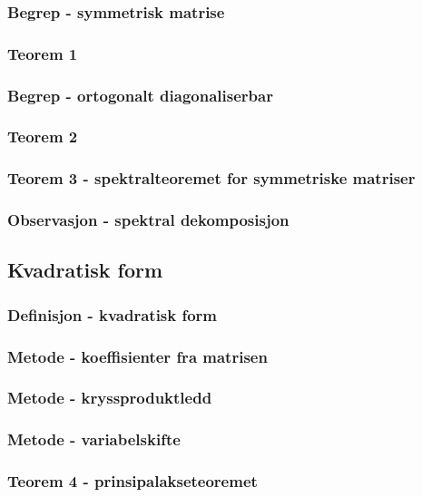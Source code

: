 \documentclass{article}
\begin{document}
      \subsubsection{Begrep - symmetrisk matrise}
        
      \subsubsection{Teorem 1}
        
      \subsubsection{Begrep - ortogonalt diagonaliserbar}
        
      \subsubsection{Teorem 2}
        
      \subsubsection{Teorem 3 - spektralteoremet for symmetriske matriser}
        
      \subsubsection{Observasjon - spektral dekomposisjon}
        
    \subsection{Kvadratisk form}
      \subsubsection{Definisjon - kvadratisk form}
        
      \subsubsection{Metode - koeffisienter fra matrisen}
        
      \subsubsection{Metode - kryssproduktledd}
        
      \subsubsection{Metode - variabelskifte}
        
      \subsubsection{Teorem 4 - prinsipalakseteoremet}
        
\end{document}
